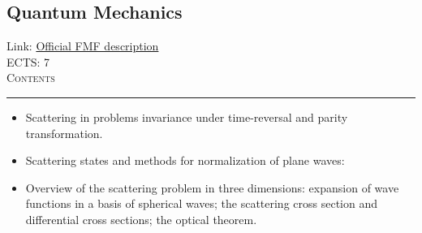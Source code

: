 \documentclass[11pt, a4paper]{article}
\newenvironment{course}[3]{
\subsection{#1}%
Link: \href{#2}{Official FMF description}\\%
ECTS: #3%
\vspace{1ex}
\\
{\large \textsc{Contents}}\\[-0.9ex]%
\rule{\textwidth}{0.5pt}
\vspace{-3ex}
}
{}
\newenvironment{chapter}[1]{
\begin{tcolorbox}[title=#1, breakable]
}
{\end{tcolorbox}}
\begin{document}
\begin{course}{Quantum Mechanics}{https://www.fmf.uni-lj.si/en/study-physics/programmes/1fiz/2020/7000777/courses/1156/}{7}
\begin{chapter}{Introduction to scattering}
\begin{itemize}
            \item Scattering in problems invariance under time-reversal and parity transformation.

            \item Scattering states and methods for normalization of plane waves:

            \item Overview of the scattering problem in three dimensions: expansion of wave functions in a basis of spherical waves; the scattering cross section and differential cross sections; the optical theorem.
        
        \end{itemize}
    \end{chapter}

\end{course}
\end{document}
